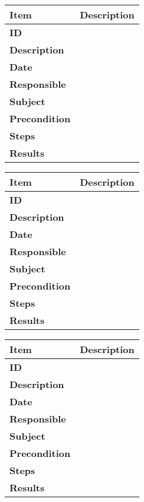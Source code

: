 \newpage{}
\begin{table}[h]
\begin{center}
\begin{tabular}{|p{4.0cm}|p{8.0cm}|}
\hline
\bf{Item} & \bf{Description}\\
\hline
\bf{ID} & \\
\bf{Description} & \\
\bf{Date} & \\
\bf{Responsible} & \\
\bf{Subject} & \\
\bf{Precondition} & \\
\bf{Steps} &
\begin{enumerate}

\end{enumerate}\\
\bf{Results} & \\
\hline
\end{tabular}
\end{center}
\end{table}
\newpage{}
\begin{table}[h]
\begin{center}
\begin{tabular}{|p{4.0cm}|p{8.0cm}|}
\hline
\bf{Item} & \bf{Description}\\
\hline
\bf{ID} & \\
\bf{Description} & \\
\bf{Date} & \\
\bf{Responsible} & \\
\bf{Subject} & \\
\bf{Precondition} & \\
\bf{Steps} & \\
\bf{Results} & 
\begin{enumerate}

\end{enumerate}\\
\hline
\end{tabular}
\end{center}
\end{table}

\begin{table}[h]
\begin{center}
\begin{tabular}{|p{4.0cm}|p{8.0cm}|}
\hline
\bf{Item} & \bf{Description}\\
\hline
\bf{ID} & \\
\bf{Description} & \\
\bf{Date} & \\
\bf{Responsible} & \\
\bf{Subject} & \\
\bf{Precondition} & \\
\bf{Steps} & \\ 
\bf{Results} & 
\\
\hline
\end{tabular}
\end{center}
\end{table}

